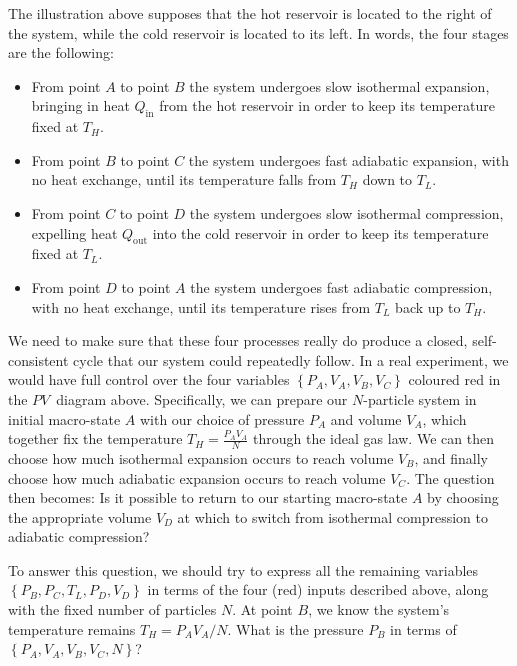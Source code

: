 \newpage %
The illustration above supposes that the hot reservoir is located to the right of the system, while the cold reservoir is located to its left.
In words, the four stages are the following: \\[-24 pt]
\begin{itemize}
  \item From point $A$ to point $B$ the system undergoes slow isothermal expansion, bringing in heat $Q_{\text{in}}$ from the hot reservoir in order to keep its temperature fixed at $T_H$.
  \item From point $B$ to point $C$ the system undergoes fast adiabatic expansion, with no heat exchange, until its temperature falls from $T_H$ down to $T_L$.
  \item From point $C$ to point $D$ the system undergoes slow isothermal compression, expelling heat $Q_{\text{out}}$ into the cold reservoir in order to keep its temperature fixed at $T_L$.
  \item From point $D$ to point $A$ the system undergoes fast adiabatic compression, with no heat exchange, until its temperature rises from $T_L$ back up to $T_H$.
\end{itemize}

We need to make sure that these four processes really do produce a closed, self-consistent cycle that our system could repeatedly follow.
In a real experiment, we would have full control over the four variables $\left\{P_A, V_A, V_B, V_C\right\}$ coloured red in the $PV$~diagram above.
Specifically, we can prepare our $N$-particle system in initial macro-state $A$ with our choice of pressure $P_A$ and volume $V_A$, which together fix the temperature $T_H = \frac{P_A V_A}{N}$ through the ideal gas law.
We can then choose how much isothermal expansion occurs to reach volume $V_B$, and finally choose how much adiabatic expansion occurs to reach volume $V_C$.
The question then becomes: Is it possible to return to our starting macro-state $A$ by choosing the appropriate volume $V_D$ at which to switch from isothermal compression to adiabatic compression?

To answer this question, we should try to express all the remaining variables $\left\{P_B, P_C, T_L, P_D, V_D\right\}$ in terms of the four (red) inputs described above, along with the fixed number of particles $N$.
At point $B$, we know the system's temperature remains $T_H = P_A V_A / N$.
What is the pressure $P_B$ in terms of $\left\{P_A, V_A, V_B, V_C, N\right\}$?
\begin{mdframed}
  \ \\[50 pt]
\end{mdframed}

